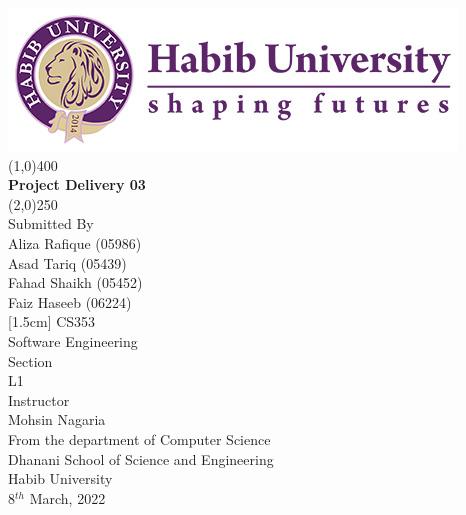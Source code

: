\begin{titlepage}
\thispagestyle{empty}
\begin{center}
\includegraphics[scale=0.40]{Figures/HU-LOGO--01.jpg}
\line(1,0){400}\\
[2mm]
\selectfont
\textbf{Project Delivery 03}\\
\line(2,0){250}\\
[0.5cm]
Submitted By\\
Aliza Rafique (05986)\\
Asad Tariq (05439)\\
Fahad Shaikh (05452)\\
Faiz Haseeb (06224)\\
[1.5cm]
CS353\\
Software Engineering\\ 
[1.0cm]
Section\\
L1\\
[1.0cm]
Instructor\\
Mohsin Nagaria\\
[1.5cm]
From the department of Computer Science\\
Dhanani School of Science and Engineering\\
Habib University\\
8$^{th}$ March, 2022
\end{center} 
\end{titlepage}